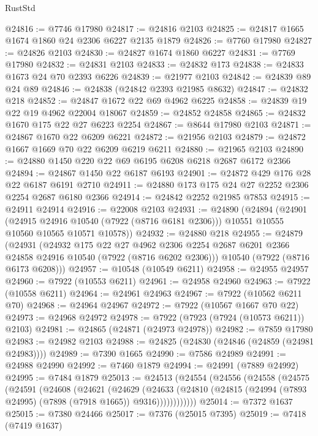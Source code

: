 \begin{lexlean}{RustStd}
\begin{coremodule}
@24816 := @7746 @17980
@24817 := @24816 @2103
@24825 := @24817 @1665 @1674 @1860 @24 @2306 @6227 @2135 @1879
@24826 := @7760 @17980
@24827 := @24826 @2103
@24830 := @24827 @1674 @1860 @6227
@24831 := @7769 @17980
@24832 := @24831 @2103
@24833 := @24832 @173
@24838 := @24833 @1673 @24 @70 @2393 @6226
@24839 := @21977 @2103
@24842 := @24839 @89 @24 @89
@24846 := @24838 (@24842 @2393 @21985 @8632)
@24847 := @24832 @218
@24852 := @24847 @1672 @22 @69 @4962 @6225
@24858 := @24839 @19 @22 @19 @4962 @22004 @18067
@24859 := @24852 @24858
@24865 := @24832 @1670 @175 @22 @27 @6223 @2254
@24867 := @8644 @17980 @2103
@24871 := @24867 @1670 @22 @6209 @6221
@24872 := @21956 @2103
@24879 := @24872 @1667 @1669 @70 @22 @6209 @6219 @6211
@24880 := @21965 @2103
@24890 := @24880 @1450 @220 @22 @69 @6195 @6208 @6218 @2687 @6172 @2366
@24894 := @24867 @1450 @22 @6187 @6193
@24901 := @24872 @429 @176 @28 @22 @6187 @6191 @2710
@24911 := @24880 @173 @175 @24 @27 @2252 @2306 @2254 @2687 @6180 @2366
@24914 := @24842 @2252 @21985 @7853
@24915 := @24911 @24914
@24916 := @22008 @2103
@24931 := @24890
    (@24894
      (@24901
        (@24915 @24916 @10540 (@7922 (@8716 @6181 @2306)))
        @10551
        @10555
        @10560
        @10565
        @10571
        @10578))
@24932 := @24880 @218
@24955 := @24879
    (@24931
      (@24932
        @175
        @22
        @27
        @4962
        @2306
        @2254
        @2687
        @6201
        @2366
        @24858
        @24916
        @10540
        (@7922 (@8716 @6202 @2306)))
      @10540
      (@7922 (@8716 @6173 @6208)))
@24957 := @10548 (@10549 @6211)
@24958 := @24955 @24957
@24960 := @7922 (@10553 @6211)
@24961 := @24958 @24960
@24963 := @7922 (@10558 @6211)
@24964 := @24961 @24963
@24967 := @7922 (@10562 @6211 @70)
@24968 := @24964 @24967
@24972 := @7922 (@10567 @1667 @70 @22)
@24973 := @24968 @24972
@24978 := @7922 (@7923 (@7924 (@10573 @6211)) @2103)
@24981 := @24865 (@24871 (@24973 @24978))
@24982 := @7859 @17980
@24983 := @24982 @2103
@24988 := @24825 (@24830 (@24846 (@24859 (@24981 @24983))))
@24989 := @7390 @1665
@24990 := @7586 @24989
@24991 := @24988 @24990
@24992 := @7460 @1879
@24994 := @24991 (@7889 @24992)
@24995 := @7484 @1879
@25013 := @24513
    (@24554
      (@24556
        (@24558
          (@24575
            (@24591
              (@24608
                (@24621
                  (@24629
                    (@24633
                      (@24810 (@24815 (@24994 (@7893 @24995) (@7898 (@7918 @1665)) @9316))))))))))))
@25014 := @7372 @1637
@25015 := @7380 @24466
@25017 := @7376 (@25015 @7395)
@25019 := @7418 (@7419 @1637)

\end{coremodule}
\end{lexlean}
